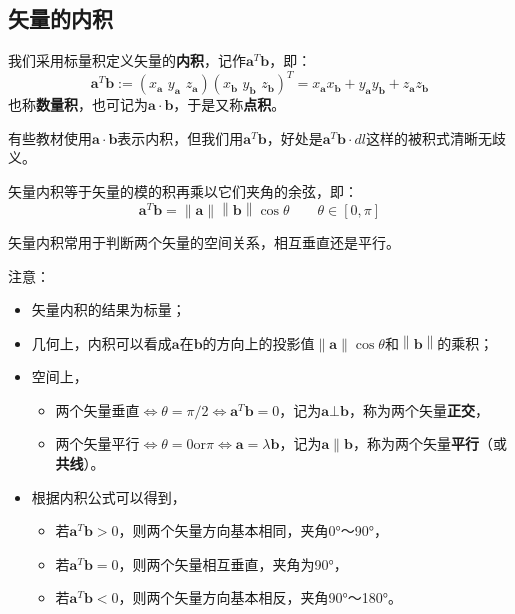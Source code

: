 \subsection{矢量的内积}

\begin{definition}[内积]
我们采用标量积定义矢量的{\bf 内积}，记作$\boldsymbol{a}^T\boldsymbol{b}$，即：
\[
\boldsymbol{a}^T\boldsymbol{b}:=\left( x_{\boldsymbol{a}}\,\,y_{\boldsymbol{a}}\,\,z_{\boldsymbol{a}} \right) \left( x_{\boldsymbol{b}}\,\,y_{\boldsymbol{b}}\,\,z_{\boldsymbol{b}} \right) ^T=x_{\boldsymbol{a}}x_{\boldsymbol{b}}+y_{\boldsymbol{a}}y_{\boldsymbol{b}}+z_{\boldsymbol{a}}z_{\boldsymbol{b}}
\]
也称{\bf 数量积}，也可记为$\boldsymbol{a}\cdot \boldsymbol{b}$，于是又称{\bf 点积}。
\end{definition}

\begin{tcolorbox}
有些教材使用$\boldsymbol{a}\cdot \boldsymbol{b}$表示内积，但我们用$\boldsymbol{a}^T\boldsymbol{b}$，好处是$\boldsymbol{a}^T\boldsymbol{b}\cdot dl$这样的被积式清晰无歧义。
\end{tcolorbox}

\begin{theorem}
矢量内积等于矢量的模的积再乘以它们夹角的余弦，即：
\[
\boldsymbol{a}^T\boldsymbol{b}=\left\| \boldsymbol{a} \right\| \left\| \boldsymbol{b} \right\| \cos \theta \qquad \theta \in \left[ 0,\pi \right]
\]
\end{theorem}

矢量内积常用于判断两个矢量的空间关系，相互垂直还是平行。

注意：
\begin{itemize}
    \item 矢量内积的结果为标量；
    \item 几何上，内积可以看成$\boldsymbol{a}$在$\boldsymbol{b}$的方向上的投影值$\left\| \boldsymbol{a} \right\| \cos \theta $和$\left\| \boldsymbol{b} \right\| $的乘积；
    \item 空间上，
    \begin{itemize}
        \item 两个矢量垂直$\Leftrightarrow \theta =\pi /2\Leftrightarrow \boldsymbol{a}^T\boldsymbol{b}=0$，记为$\boldsymbol{a}\bot \boldsymbol{b}$，称为两个矢量{\bf 正交}，
        \item 两个矢量平行$\Leftrightarrow \theta =0\mathrm{or}\pi \Leftrightarrow \boldsymbol{a}=\lambda \boldsymbol{b}$，记为$\boldsymbol{a}\parallel \boldsymbol{b}$，称为两个矢量{\bf 平行}（或{\bf 共线}）。
    \end{itemize}
    \item 根据内积公式可以得到，
    \begin{itemize}
        \item 若$\boldsymbol{a}^T\boldsymbol{b}>0$，则两个矢量方向基本相同，夹角0°～90°，
        \item 若$\boldsymbol{a}^T\boldsymbol{b}=0$，则两个矢量相互垂直，夹角为90°，
        \item 若$\boldsymbol{a}^T\boldsymbol{b}<0$，则两个矢量方向基本相反，夹角90°～180°。
    \end{itemize}
\end{itemize}

